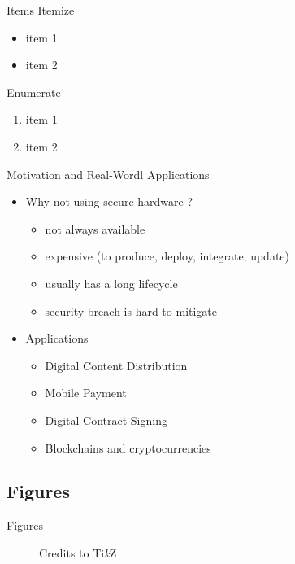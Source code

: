 \documentclass[aspectratio=169,compress]{beamer}
\begin{document}
\begin{frame}{Items}
  Itemize
  \begin{itemize}
    \item item 1
    \item item 2
  \end{itemize}

  \bigskip

  Enumerate
  \begin{enumerate}
    \item item 1
    \item item 2
  \end{enumerate}
\end{frame}

\begin{frame}{Motivation and Real-Wordl Applications}
  \begin{itemize}
    \item Why not using secure hardware ?
  \begin{itemize}
    \item not always available 
    \item expensive (to produce, deploy, integrate, update)
    \item usually has a long lifecycle
    \item security breach is hard to mitigate
  \end{itemize}
  \end{itemize}
  \begin{itemize}
    \item Applications
  \begin{itemize}
    \item Digital Content Distribution
    \item Mobile Payment
    \item Digital Contract Signing
    \item Blockchains and cryptocurrencies
  \end{itemize}
  \end{itemize}


\end{frame}



\subsection{Figures}

\begin{frame}{Figures}
  \begin{figure}
    \centering
    \caption{Credits to Ti\textit{k}Z}
  \end{figure}
\end{frame}
\end{document}
